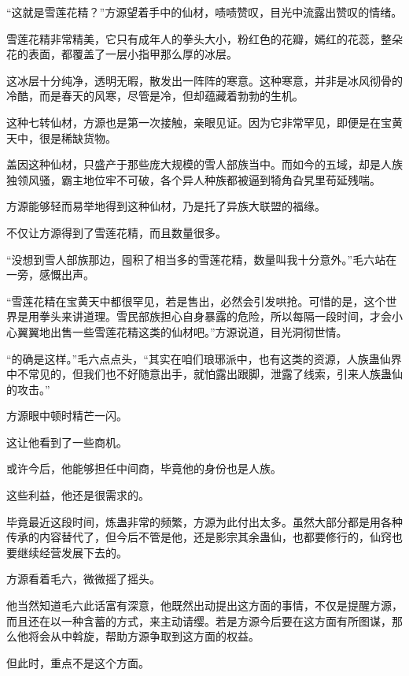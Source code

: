 
\begin{this_body}

“这就是雪莲花精？”方源望着手中的仙材，啧啧赞叹，目光中流露出赞叹的情绪。

雪莲花精非常精美，它只有成年人的拳头大小，粉红色的花瓣，嫣红的花蕊，整朵花的表面，都覆盖了一层小指甲那么厚的冰层。

这冰层十分纯净，透明无暇，散发出一阵阵的寒意。这种寒意，并非是冰风彻骨的冷酷，而是春天的风寒，尽管是冷，但却蕴藏着勃勃的生机。

这种七转仙材，方源也是第一次接触，亲眼见证。因为它非常罕见，即便是在宝黄天中，很是稀缺货物。

盖因这种仙材，只盛产于那些庞大规模的雪人部族当中。而如今的五域，却是人族独领风骚，霸主地位牢不可破，各个异人种族都被逼到犄角旮旯里苟延残喘。

方源能够轻而易举地得到这种仙材，乃是托了异族大联盟的福缘。

不仅让方源得到了雪莲花精，而且数量很多。

“没想到雪人部族那边，囤积了相当多的雪莲花精，数量叫我十分意外。”毛六站在一旁，感慨出声。

“雪莲花精在宝黄天中都很罕见，若是售出，必然会引发哄抢。可惜的是，这个世界是用拳头来讲道理。雪民部族担心自身暴露的危险，所以每隔一段时间，才会小心翼翼地出售一些雪莲花精这类的仙材吧。”方源说道，目光洞彻世情。

“的确是这样。”毛六点点头，“其实在咱们琅琊派中，也有这类的资源，人族蛊仙界中不常见的，但我们也不好随意出手，就怕露出跟脚，泄露了线索，引来人族蛊仙的攻击。”

方源眼中顿时精芒一闪。

这让他看到了一些商机。

或许今后，他能够担任中间商，毕竟他的身份也是人族。

这些利益，他还是很需求的。

毕竟最近这段时间，炼蛊非常的频繁，方源为此付出太多。虽然大部分都是用各种传承的内容替代了，但今后不管是他，还是影宗其余蛊仙，也都要修行的，仙窍也要继续经营发展下去的。

方源看着毛六，微微摇了摇头。

他当然知道毛六此话富有深意，他既然出动提出这方面的事情，不仅是提醒方源，而且还在以一种含蓄的方式，来主动请缨。若是方源今后要在这方面有所图谋，那么他将会从中斡旋，帮助方源争取到这方面的权益。

但此时，重点不是这个方面。


\end{this_body}
